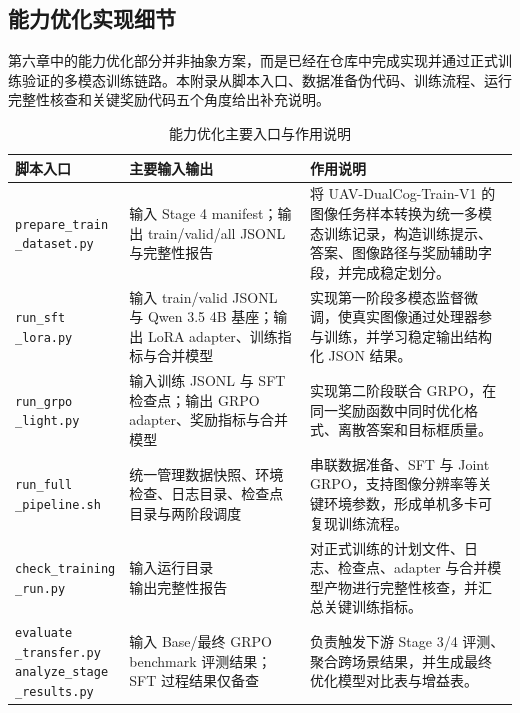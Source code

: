 \begin{thesisappendix}
\section{能力优化实现细节}
\label{app:optimization-entry}

第六章中的能力优化部分并非抽象方案，而是已经在仓库中完成实现并通过正式训练验证的多模态训练链路。本附录从脚本入口、数据准备伪代码、训练流程、运行完整性核查和关键奖励代码五个角度给出补充说明。

\begin{table}[htbp]
    \centering
    \caption{能力优化主要入口与作用说明}
    \label{tab:app-optimization-entry}
    \scriptsize
    \begin{tabularx}{\textwidth}{@{}p{2.6cm}p{4.1cm}X@{}}
        \toprule
        脚本入口 & 主要输入输出 & 作用说明 \\
        \midrule
        \makecell[l]{\texttt{prepare\_train}\\\texttt{\_dataset.py}} & 输入 Stage 4 manifest；输出 train/valid/all JSONL 与完整性报告 & 将 UAV-DualCog-Train-V1 的图像任务样本转换为统一多模态训练记录，构造训练提示、答案、图像路径与奖励辅助字段，并完成稳定划分。 \\
        \makecell[l]{\texttt{run\_sft}\\\texttt{\_lora.py}} & 输入 train/valid JSONL 与 Qwen 3.5 4B 基座；输出 LoRA adapter、训练指标与合并模型 & 实现第一阶段多模态监督微调，使真实图像通过处理器参与训练，并学习稳定输出结构化 JSON 结果。 \\
        \makecell[l]{\texttt{run\_grpo}\\\texttt{\_light.py}} & 输入训练 JSONL 与 SFT 检查点；输出 GRPO adapter、奖励指标与合并模型 & 实现第二阶段联合 GRPO，在同一奖励函数中同时优化格式、离散答案和目标框质量。 \\
        \makecell[l]{\texttt{run\_full}\\\texttt{\_pipeline.sh}} & 统一管理数据快照、环境检查、日志目录、检查点目录与两阶段调度 & 串联数据准备、SFT 与 Joint GRPO，支持图像分辨率等关键环境参数，形成单机多卡可复现训练流程。 \\
        \makecell[l]{\texttt{check\_training}\\\texttt{\_run.py}} & \makecell[l]{输入运行目录\\输出完整性报告} & 对正式训练的计划文件、日志、检查点、adapter 与合并模型产物进行完整性核查，并汇总关键训练指标。 \\
        \makecell[l]{\texttt{evaluate}\\\texttt{\_transfer.py}\\\texttt{analyze\_stage}\\\texttt{\_results.py}} & \makecell[l]{输入 Base/最终 GRPO\\benchmark 评测结果；\\SFT 过程结果仅备查} & 负责触发下游 Stage 3/4 评测、聚合跨场景结果，并生成最终优化模型对比表与增益表。 \\
        \bottomrule
    \end{tabularx}
\end{table}


\end{thesisappendix}
